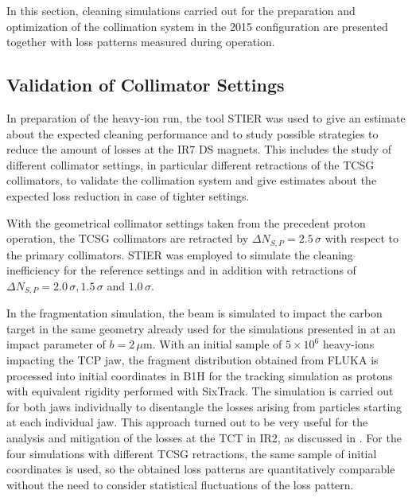 In this section, cleaning simulations carried out for the preparation and optimization of the collimation system in the 2015 configuration are presented together with loss patterns measured during operation. 

\subsection{Validation of Collimator Settings} \label{chap:STIER:validation}

In preparation of the heavy-ion run, the tool STIER was used to give an estimate about the expected cleaning performance and to study possible strategies to reduce the amount of losses at the IR7 DS magnets. This includes the study of different collimator settings, in particular different retractions of the TCSG collimators, to validate the collimation system and give estimates about the expected loss reduction in case of tighter settings. 

With the geometrical collimator settings taken from the precedent proton operation, the TCSG collimators are retracted by $\Delta N_{S,P}=2.5\,\sigma$ with respect to the primary collimators. STIER was employed to simulate the cleaning inefficiency for the reference settings and in addition with retractions of $\Delta N_{S,P} = 2.0\,\sigma, 1.5\,\sigma$ and $1.0\,\sigma$. 

In the fragmentation simulation, the \lead beam is simulated to impact the carbon target in the same geometry already used for the simulations presented in \chapref{} at an impact parameter of $b=2\,\mu$m. With an initial sample of $5\times10^6$ heavy-ions impacting the TCP jaw, the fragment distribution obtained from FLUKA is processed into initial coordinates in B1H for the tracking simulation as protons with equivalent rigidity performed with SixTrack. The simulation is carried out for both jaws individually to disentangle the losses arising from particles starting at each individual jaw. This approach turned out to be very useful for the analysis and mitigation of the losses at the TCT in IR2, as discussed in . For the four simulations with different TCSG retractions, the same sample of initial coordinates is used, so the obtained loss patterns are quantitatively comparable without the need to consider statistical fluctuations of the loss pattern.

